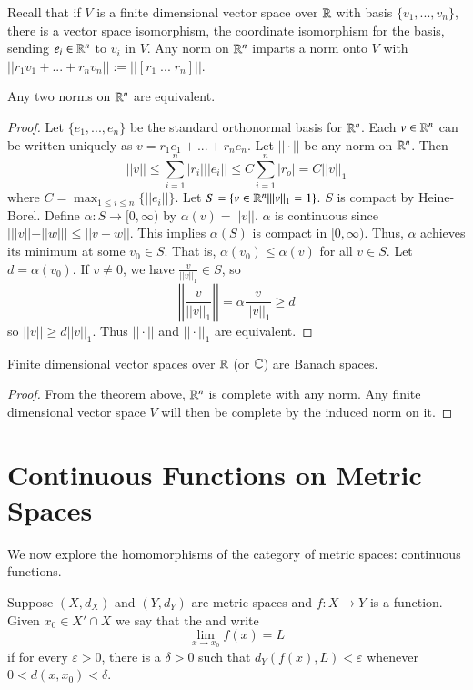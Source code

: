 Recall that if $V$ is a finite dimensional vector space over $\mathbb R$ with basis $\{v_1,...,v_n\}$, there is a vector space isomorphism, the coordinate isomorphism for the basis, sending $e_i \in \mathbb R^n$ to $v_i$ in $V$. Any norm on $\mathbb R^n$ imparts a norm onto $V$ with $||r_1v_1+...+r_nv_n|| := ||[r_1\;...\;r_n]||$.

\begin{thm}
    Any two norms on $\mathbb R^n$ are equivalent.
\end{thm}
\begin{proof}
    Let $\{e_1,...,e_n\}$ be the standard orthonormal basis for $\mathbb R^n$. Each $v \in \mathbb R^n$ can be written uniquely as $v = r_1e_1+...+r_ne_n$. Let $||\cdot||$ be any norm on $\mathbb R^n$. Then $$||v|| \leq \sum_{i=1}^n|r_i|||e_i|| \leq C\sum_{i=1}^n|r_o| = C||v||_1$$ where $C = \max_{1\leq i \leq n}\{||e_i||\}$. Let $S = \{v \in \mathbb R^n\vert ||v||_1 = 1\}$. $S$ is compact by Heine-Borel. Define $\alpha:S\rightarrow [0,\infty)$ by $\alpha(v) = ||v||$. $\alpha$ is continuous since $|||v|| - ||w||| \leq ||v-w||$. This implies $\alpha(S)$ is compact in $[0,\infty)$. Thus, $\alpha$ achieves its minimum at some $v_0 \in S$. That is, $\alpha(v_0) \leq \alpha(v)$ for all $v \in S$. Let $d = \alpha(v_0)$. If $v \neq 0$, we have $\frac{v}{||v||_1} \in S$, so $$\left|\left|\frac{v}{||v||_1}\right|\right| = \alpha\frac{v}{||v||_1} \geq d$$ so $||v|| \geq d||v||_1$. Thus $||\cdot||$ and $||\cdot||_1$ are equivalent.
\end{proof}

\begin{cor}
    Finite dimensional vector spaces over $\mathbb R$ (or $\mathbb C$) are Banach spaces.
\end{cor}
\begin{proof}
    From the theorem above, $\mathbb R^n$ is complete with any norm. Any finite dimensional vector space $V$ will then be complete by the induced norm on it.
\end{proof}




\section{Continuous Functions on Metric Spaces}

We now explore the homomorphisms of the category of metric spaces: continuous functions.

\begin{defn}
    Suppose $(X,d_X)$ and $(Y,d_Y)$ are metric spaces and $f:X\rightarrow Y$ is a function. Given $x_0 \in X'\cap X$ we say that the  and write $$\lim\limits_{x\rightarrow x_0}f(x) = L$$ if for every $\varepsilon > 0$, there is a $\delta > 0$ such that $d_Y(f(x),L) < \varepsilon$ whenever $0 < d(x,x_0) < \delta$.
\end{defn}


